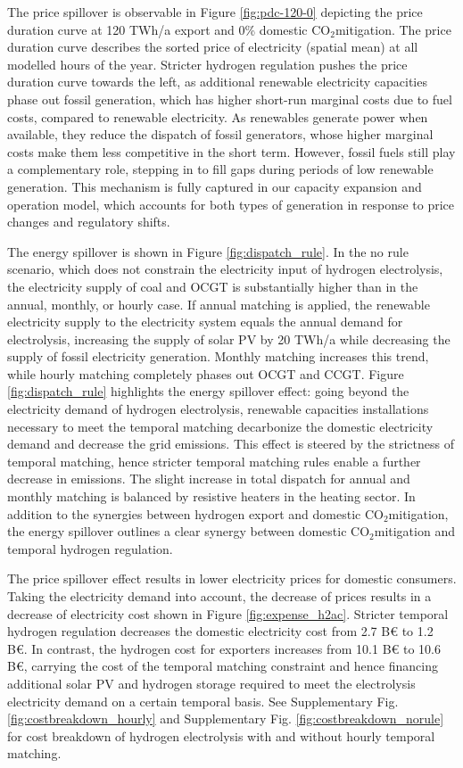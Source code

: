 \documentclass[5p,numafflabel]{elsarticle}
\newcommand{\co}{\ce{CO2}~}
\def\co{CO${}_2${\:}}
\begin{document}
The price spillover is observable in Figure \ref{fig:pdc-120-0} depicting the price duration curve at 120 TWh/a export and 0\% domestic \co mitigation. The price duration curve describes the sorted price of electricity (spatial mean) at all modelled hours of the year.
Stricter hydrogen regulation pushes the price duration curve towards the left, as additional renewable electricity capacities phase out fossil generation, which has higher short-run marginal costs due to fuel costs, compared to renewable electricity.
As renewables generate power when available, they reduce the dispatch of fossil generators, whose higher marginal costs make them less competitive in the short term. However, fossil fuels still play a complementary role, stepping in to fill gaps during periods of low renewable generation. This mechanism is fully captured in our capacity expansion and operation model, which accounts for both types of generation in response to price changes and regulatory shifts.


The energy spillover is shown in Figure \ref{fig:dispatch_rule}. In the no rule scenario, which does not constrain the electricity input of hydrogen electrolysis, the electricity supply of coal and OCGT is substantially higher than in the annual, monthly, or hourly case. If annual matching is applied, the renewable electricity supply to the electricity system equals the annual demand for electrolysis, increasing the supply of solar PV by 20 TWh/a while decreasing the supply of fossil electricity generation. 
Monthly matching increases this trend, while hourly matching completely phases out OCGT and CCGT. Figure \ref{fig:dispatch_rule} highlights the energy spillover effect: going beyond the electricity demand of hydrogen electrolysis, renewable capacities installations necessary to meet the temporal matching decarbonize the domestic electricity demand and decrease the grid emissions. This effect is steered by the strictness of temporal matching, hence stricter temporal matching rules enable a further decrease in emissions.
The slight increase in total dispatch for annual and monthly matching is balanced by resistive heaters in the heating sector.
In addition to the synergies between hydrogen export and domestic \co mitigation, the energy spillover outlines a clear synergy between domestic \co mitigation and temporal hydrogen regulation.



The price spillover effect results in lower electricity prices for domestic consumers. Taking the electricity demand into account, the decrease of prices results in a decrease of electricity cost shown in 
Figure \ref{fig:expense_h2ac}. Stricter temporal hydrogen regulation decreases the domestic electricity cost from 2.7 B€ to 1.2 B€. In contrast, the hydrogen cost for exporters increases from 10.1 B€ to 10.6 B€, carrying the cost of the temporal matching constraint and hence financing additional solar PV and hydrogen storage required to meet the electrolysis electricity demand on a certain temporal basis. See Supplementary Fig. \ref{fig:costbreakdown_hourly} and Supplementary Fig. \ref{fig:costbreakdown_norule} for cost breakdown of hydrogen electrolysis with and without hourly temporal matching.
\end{document}
